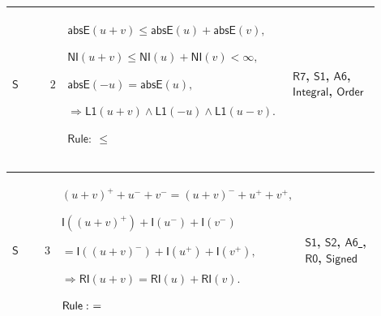 \documentclass[12pt,reqno]{amsart}
\theoremstyle{blueplain}
\numberwithin{equation}{section}
\begin{document}
{\scriptsize \setlength{\parskip}{0pt}\nointerlineskip
\noindent 
\begin{tabular}{|@{}>{\centering\arraybackslash}m{0.10658\linewidth}|>{\centering\arraybackslash}m{0.03553\linewidth}|>{\centering\arraybackslash}m{0.52105\linewidth}|>{\centering\arraybackslash}m{0.23684\linewidth}|}
\hline
\hypertarget{dct:S2}{$\displaystyle \mathsf{S}$} & $\displaystyle 2$ & $%
\displaystyle \mathsf{absE}(u+v)\le\mathsf{absE}(u)+\mathsf{absE}(v),$\par$%
\displaystyle \mathsf{NI}(u+v)\le\mathsf{NI}(u)+\mathsf{NI}(v)<\infty,$\par$%
\displaystyle \mathsf{absE}(-u)=\mathsf{absE}(u),$\par$\displaystyle %
\Rightarrow\mathsf{L1}(u+v)\land\mathsf{L1}(-u)\land\mathsf{L1}(u-v).$\par$%
\displaystyle \mathsf{Rule}:\ \le$ & \hyperlink{dct:R7}{$\displaystyle 
\mathsf{R7}$}, \hyperlink{dct:S1}{$\displaystyle \mathsf{S1}$}, \hyperlink{dct:A6}%
{$\displaystyle \mathsf{A6}$}, \hyperlink{lem:Integral}{$\displaystyle 
\mathsf{Integral}$}, \hyperlink{ax:Order}{$\displaystyle \mathsf{Order}$} \\ 
\hline
\end{tabular}%
}

{\scriptsize \setlength{\parskip}{0pt}\nointerlineskip
\noindent 
\begin{tabular}{|@{}>{\centering\arraybackslash}m{0.10658\linewidth}|>{\centering\arraybackslash}m{0.03553\linewidth}|>{\centering\arraybackslash}m{0.52105\linewidth}|>{\centering\arraybackslash}m{0.23684\linewidth}|}
\hline
\hypertarget{dct:S3}{$\displaystyle \mathsf{S}$} & $\displaystyle 3$ & $%
\displaystyle (u+v)^++u^-+v^-=(u+v)^-+u^++v^+,$\par$\displaystyle \mathsf{I}%
((u+v)^+)+\mathsf{I}(u^-)+\mathsf{I}(v^-)$\par$\displaystyle {}=\mathsf{I}%
((u+v)^-)+\mathsf{I}(u^+)+\mathsf{I}(v^+),$\par$\displaystyle \Rightarrow%
\mathsf{RI}(u+v)=\mathsf{RI}(u)+\mathsf{RI}(v).$\par$\displaystyle \mathsf{%
Rule}:\ =$ & \hyperlink{dct:S1}{$\displaystyle \mathsf{S1}$}, \hyperlink{dct:S2}%
{$\displaystyle \mathsf{S2}$}, \hyperlink{dct:A6}{$\displaystyle \mathsf{A6}$%
}, \hyperlink{dct:R0}{$\displaystyle \mathsf{R0}$}, \hyperlink{dctdef:Signed}%
{$\displaystyle \mathsf{Signed}$} \\ \hline
\end{tabular}%
}
\end{document}
